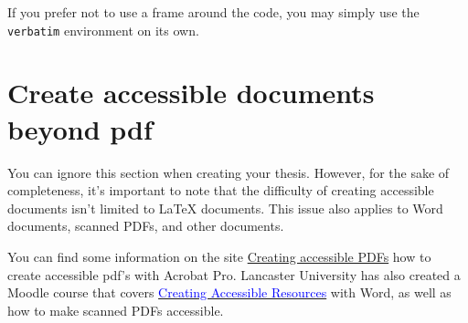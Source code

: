 If you prefer not to use a frame around the code, you may simply use the 
\texttt{verbatim} environment on its own.


\section{Create accessible documents beyond pdf}
\label{sec:advice-how-to-create-accessible-documents}

You can ignore this section when creating your thesis.
However, for the sake of completeness, it's important to note that the difficulty of creating accessible documents isn't limited to LaTeX documents. This issue also applies to Word documents, scanned PDFs, and other documents.

You can find some information on the site \href{https://portal.lancaster.ac.uk/ask/digital/accessibility/accessibility-guides/creating-accessible-pdfs/}{Creating accessible PDFs} how to create accessible pdf's with Acrobat Pro.
Lancaster University has also created a Moodle course that covers
\href{https://development.lancaster.ac.uk/mod/page/view.php?id=446}{\textcolor{blue}{Creating Accessible Resources}} with Word, as well as how to make scanned PDFs accessible.



